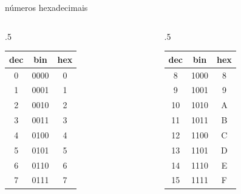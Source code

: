 \documentclass{beamer}
\begin{document}
\begin{frame}{números hexadecimais}
  \begin{columns}
    \begin{column}{.5\textwidth}
      \centering
      \begin{tabular}{ccc}
        \hline
        dec & bin & hex \\
        \hline
        0 & 0000 & 0\\
        1 & 0001 & 1\\
        2 & 0010 & 2\\
        3 & 0011 & 3\\
        4 & 0100 & 4\\
        5 & 0101 & 5\\
        6 & 0110 & 6\\
        7 & 0111 & 7\\
        \hline
      \end{tabular}
    \end{column}
    \begin{column}{.5\textwidth}
      \centering
      \begin{tabular}{ccc}
        \hline
        dec & bin & hex \\
        \hline
        8 & 1000 & 8\\
        9 & 1001 & 9\\
        10 & 1010 & A\\
        11 & 1011 & B\\
        12 & 1100 & C\\
        13 & 1101 & D\\
        14 & 1110 & E\\
        15 & 1111 & F\\
        \hline
      \end{tabular}
    \end{column}
  \end{columns}

  \framebreak


\end{frame}
\end{document}
